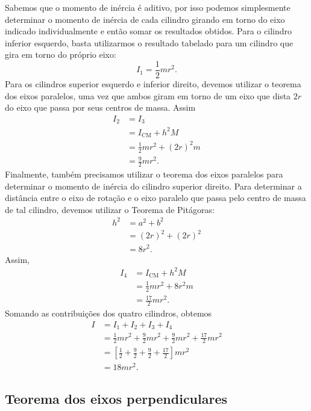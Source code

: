 Sabemos que o momento de inércia é aditivo, por isso podemos simplesmente determinar o momento de inércia de cada cilindro girando em torno do eixo indicado individualmente e então somar os resultados obtidos. Para o cilindro inferior esquerdo, basta utilizarmos o resultado tabelado para um cilindro que gira em torno do próprio eixo:
\begin{equation}
    I_1 = \frac{1}{2} mr^2.
\end{equation}
%
Para os cilindros superior esquerdo e inferior direito, devemos utilizar o teorema dos eixos paralelos, uma vez que ambos giram em torno de um eixo que dista $2r$ do eixo que passa por seus centros de massa. Assim
\begin{align}
    I_2 &= I_3 \\
    &= I_{\text{CM}} + h^2 M \\
    &= \frac{1}{2} mr^2 + (2r)^2 m \\
    &= \frac{9}{2} mr^2.
\end{align}
%
Finalmente, também precisamos utilizar o teorema dos eixos paralelos para determinar o momento de inércia do cilindro superior direito. Para determinar a distância entre o eixo de rotação e o eixo paralelo que passa pelo centro de massa de tal cilindro, devemos utilizar o Teorema de Pitágoras:
\begin{align}
    h^2 &= a^2 + b^2 \\
    &= (2r)^2 + (2r)^2 \\
    &= 8r^2.
\end{align}
%
Assim,
\begin{align}
    I_4 &= I_{\text{CM}} + h^2M \\
    &= \frac{1}{2} mr^2 + 8r^2 m \\
    &= \frac{17}{2} mr^2.
\end{align}
%
Somando as contribuições dos quatro cilindros, obtemos
\begin{align}
    I &= I_1 + I_2 + I_3 + I_4 \\
    &= \frac{1}{2} mr^2 + \frac{9}{2} mr^2 + \frac{9}{2} mr^2 + \frac{17}{2} mr^2 \\
    &= \left[\frac{1}{2} + \frac{9}{2} + \frac{9}{2} + \frac{17}{2}\right]mr^2 \\
    &= 18 mr^2.
\end{align}

\subsection{Teorema dos eixos perpendiculares}

